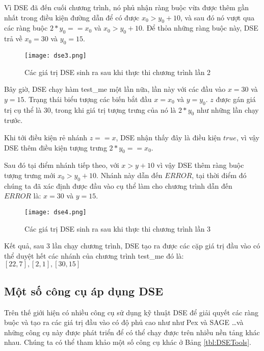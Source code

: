 Vì DSE đã đến cuối chương trình, nó phủ nhận ràng buộc vừa được thêm gần nhất trong điều kiện đường dẫn để có được $ x_{0} > y_{0} + 10 $, và sau đó nó vượt qua các ràng buộc $ 2*y_{0} == x_{0} $ và $ x_{0} > y_{0} + 10$. Để thỏa những ràng buộc này, DSE trả về $x_{0} = 30$ và $y_{0} = 15$.

\begin{center}
	\begin{figure}[H]
		\begin{center}
			\texttt{[image: dse3.png]}
		\end{center}
		\caption{Các giá trị DSE sinh ra sau khi thực thi chương trình lần 2}
		\label{dse3}
	\end{figure}
\end{center}

Bây giờ, DSE chạy hàm test\_me một lần nữa, lần này với các đầu vào $x = 30$ và $y = 15$. Trạng thái biểu tượng các biến bắt đầu $x = x_{0}$ và $y = y_{0}$. $z$ được gán giá trị cụ thể là $30$, trong khi giá trị tượng trưng của nó là $2*y_0$ như những lần chạy trước.

Khi tới điều kiện rẻ nhánh $z == x$, DSE nhận thấy đây là điều kiện $true$, vì vậy DSE thêm điều kiện tượng trưng $2*y_{0} == x_{0}$.

Sau đó tại điểm nhánh tiếp theo, với $x > y + 10$ vì vậy DSE thêm ràng buộc tượng trưng mới $ x_{0} > y_{0}+ 10 $. Nhánh này dẫn đến $ERROR$, tại thời điểm đó chúng ta đã xác định được đầu vào cụ thể làm cho chương trình dẫn đến $ERROR$ là: $x = 30$ và $y = 15$.

\begin{center}
	\begin{figure}[H]
		\begin{center}
			\texttt{[image: dse4.png]}
		\end{center}
		\caption{Các giá trị DSE sinh ra sau khi thực thi chương trình lần 3}
		\label{dse4}
	\end{figure}
\end{center}

Kết quả, sau 3 lần chạy chương trình, DSE tạo ra được các cặp giá trị đầu vào có thể duyệt hết các nhánh của chương trình test\_me đó là: $[22,7], [2,1], [30,15]$
	
\subsection{Một số công cụ áp dụng DSE}	

Trên thế giới hiện có nhiều công cụ sử dụng kỹ thuật DSE để giải quyết
các ràng buộc và tạo ra các giá trị đầu vào có độ phủ cao như như Pex
\cite{tillmann2008pex} và SAGE \cite{godefroid2008automated}\dots và
những công cụ này được phát triển để có thể chạy được trên nhiều nền
tảng khác nhau. Chúng ta có thể tham khảo một số công cụ khác ở Bảng \ref{tbl:DSETools}.
		
